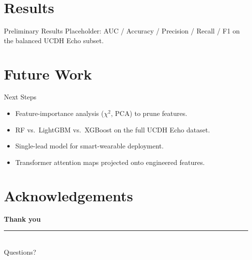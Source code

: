 \documentclass[10pt,aspectratio=169]{beamer}
\newcommand{\Raleway}{\sffamily}
\newcommand{\Lato}{\sffamily}
\begin{document}
\section{Results}

\begin{frame}{Preliminary Results}
  Placeholder: AUC / Accuracy / Precision / Recall / F1 on the balanced
  UCDH Echo subset.
\end{frame}

\section{Future Work}

\begin{frame}{Next Steps}
  \begin{itemize}
    \item Feature-importance analysis ($\chi^2$, PCA) to prune features.
    \item RF vs.\ LightGBM vs.\ XGBoost on the full UCDH Echo dataset.
    \item Single-lead model for smart-wearable deployment.
    \item Transformer attention maps projected onto engineered features.
  \end{itemize}
\end{frame}

\section*{Acknowledgements}

{%
  \begin{frame}
    \vfill
    \centering
    {\Raleway\bfseries\Huge\color{white} Thank you}\\[0.6em]
    {\color{aggiegold}\rule{4cm}{0.06cm}}\\[0.8em]
    {\Lato\large\color{white} Questions?}
    \vfill
  \end{frame}
}
\end{document}

